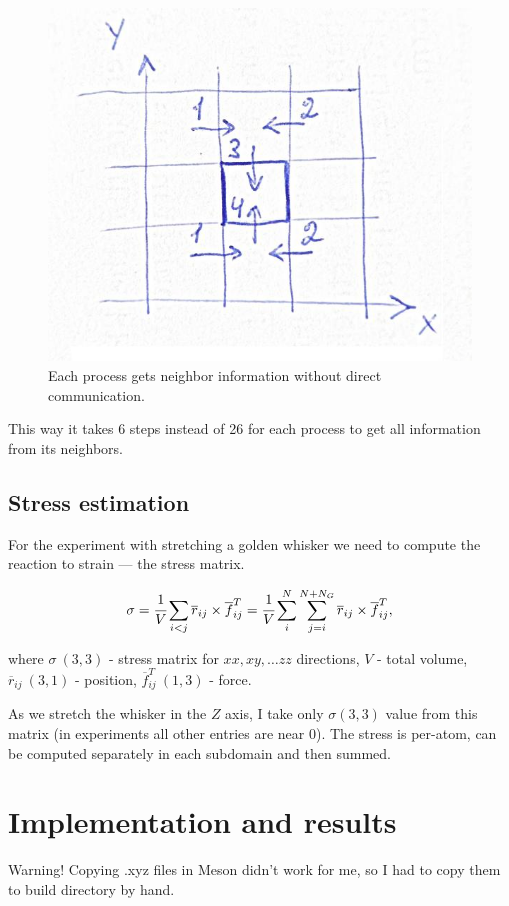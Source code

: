 \documentclass[12pt,a4paper]{article}
\newcommand{\mat}[1]{\overline{#1}}
\begin{document}
\begin{figure}[h!]
	\centering
	\includegraphics[width=.5\linewidth]{img/milestone08-domain-communication.jpg}
	\caption{Each process gets neighbor information without direct communication.}
	\label{fig:domain-communication}
\end{figure}

This way it takes 6 steps instead of 26 for each process to get all information from its neighbors.

\subsection*{Stress estimation}

For the experiment with stretching a golden whisker we need to compute the reaction to strain --- the stress matrix.

\[
\sigma = \cfrac{1}{V} \sum_{i<j} \mat{r}_{ij} \times \mat{f}^T_{ij} = \cfrac{1}{V} \sum_i^{N} \sum_{j=i}^{N+N_G} \mat{r}_{ij} \times \mat{f}^T_{ij},
\]

where $\sigma\ (3, 3)$ - stress matrix for $xx, xy, \ldots zz$ directions, $V$ - total volume, $\mat{r}_{ij}\ (3, 1)$ - position, $\mat{f}^T_{ij}\ (1, 3)$ - force.

As we stretch the whisker in the $Z$ axis, I take only $\sigma(3, 3)$ value from this matrix (in experiments all other entries are near 0). The stress is per-atom, can be computed separately in each subdomain and then summed.



\clearpage

\section{Implementation and results}
\label{implementation}

Warning! Copying .xyz files in Meson didn't work for me, so I had to copy them to build directory by hand.
\end{document}
